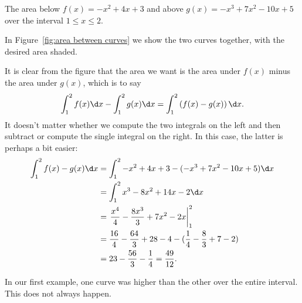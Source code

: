 \begin{marginfigure}
\caption{The area below $f(x)= -x^2+4x+3$ and above
$g(x)=-x^3+7x^2-10x+5$ over the interval $1\le x\le2$. }
\label{fig:area between curves}
\end{marginfigure}

\begin{solution}
In Figure~\ref{fig:area between curves} we show the two curves
together, with the desired area shaded.

It is clear from the figure that the area we want is the area under
$f(x)$ minus the area under $g(x)$, which is to say
\[
\int_1^2 f(x)\d x-\int_1^2 g(x)\d x = \int_1^2 \left(f(x)-g(x)\right)\d x.
\]
It doesn't matter whether we compute the two integrals on the left and
then subtract or compute the single integral on the right. In this
case, the latter is perhaps a bit easier:
\begin{align*}
  \int_1^2 f(x)-g(x)\d x&=\int_1^2 -x^2+4x+3-(-x^3+7x^2-10x+5)\d x \\
  &=\int_1^2 x^3-8x^2+14x-2\d x \\
  &=\left.{x^4\over4}-{8x^3\over3}+7x^2-2x\right|_1^2 \\
  &={16\over4}-{64\over3}+28-4-({1\over4}-{8\over3}+7-2) \\
  &=23-{56\over3}-{1\over4}={49\over12}.
\end{align*}
\end{solution}

In our first example, one curve was higher than the other over the
entire interval. This does not always happen.


